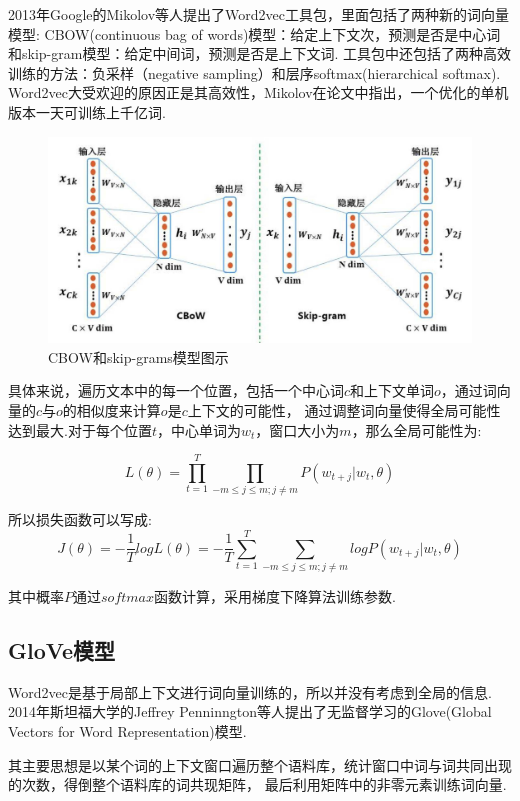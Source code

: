 \documentclass[bachelor,winfonts]{jnuthesis}
\begin{document}
2013年Google的Mikolov等人提出了Word2vec工具包\cite{Mikolov2013Distributed}，里面包括了两种新的词向量模型:
CBOW(continuous bag of words)模型：给定上下文次，预测是否是中心词
和skip-gram模型：给定中间词，预测是否是上下文词.
工具包中还包括了两种高效训练的方法：负采样（negative sampling）和层序softmax(hierarchical softmax).
Word2vec大受欢迎的原因正是其高效性，Mikolov在论文中指出，一个优化的单机版本一天可训练上千亿词.

\begin{figure}[h!]
  \centering
  \includegraphics[width=0.6\linewidth]{CBOW-skip-gram.png}
  \caption{CBOW和skip-grams模型图示}
\end{figure}

具体来说，遍历文本中的每一个位置，包括一个中心词$c$和上下文单词$o$，通过词向量的$c$与$o$的相似度来计算$o$是$c$上下文的可能性，
通过调整词向量使得全局可能性达到最大.对于每个位置$t$，中心单词为$w_{t}$，窗口大小为$m$，那么全局可能性为:

\begin{equation}
  L(\theta) = \prod_{t=1}^{T} \prod_{-m \le j \le m ;j \neq m} P(w_{t+j}|w_{t},\theta)
\end{equation}

所以损失函数可以写成:
\begin{equation}
  J(\theta) = -\frac{1}{T}logL(\theta) = -\frac{1}{T} \sum_{t=1}^{T} \sum_{-m \le j \le m ;j \neq m} log P(w_{t+j}|w_{t},\theta)
\end{equation}

其中概率$P$通过$softmax$函数计算，采用梯度下降算法训练参数.

\subsection{GloVe模型}
Word2vec是基于局部上下文进行词向量训练的，所以并没有考虑到全局的信息.
2014年斯坦福大学的Jeffrey Penninngton等人\cite{Pennington2014Glove}提出了无监督学习的Glove(Global Vectors for Word Representation)模型.

其主要思想是以某个词的上下文窗口遍历整个语料库，统计窗口中词与词共同出现的次数，得倒整个语料库的词共现矩阵，
最后利用矩阵中的非零元素训练词向量.
\end{document}
